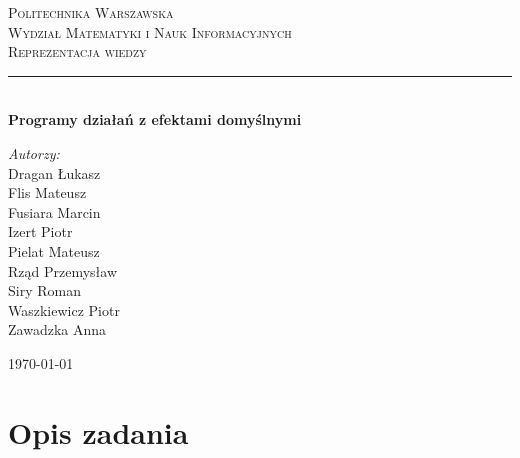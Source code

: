 \documentclass{article}
\begin{document}
	
\begin{titlepage}

\newcommand{\HRule}{\rule{\linewidth}{0.5mm}}
\newcommand{\Action}[1]{\textsc{#1}}

\center


\textsc{\LARGE Politechnika Warszawska}\\[5mm]
\textsc{\LARGE Wydział Matematyki i Nauk Informacyjnych}\\[3.5cm]
 

\textsc{\Huge Reprezentacja wiedzy}\\[0.5cm]


\HRule \\[0.4cm]
{ \LARGE \bfseries Programy działań z efektami domyślnymi}\\[2.5cm]
 

\begin{flushright}
\Large \emph{Autorzy:}\\[0.5cm]
Dragan Łukasz\\
Flis Mateusz\\
Fusiara Marcin\\
Izert Piotr\\
Pielat Mateusz\\
Rząd Przemysław\\
Siry Roman\\
Waszkiewicz Piotr\\
Zawadzka Anna\\

\end{flushright}

\vfill
{\large \today}\\[3cm]

\end{titlepage}
	
\newpage

\section{Opis zadania}
\end{document}
